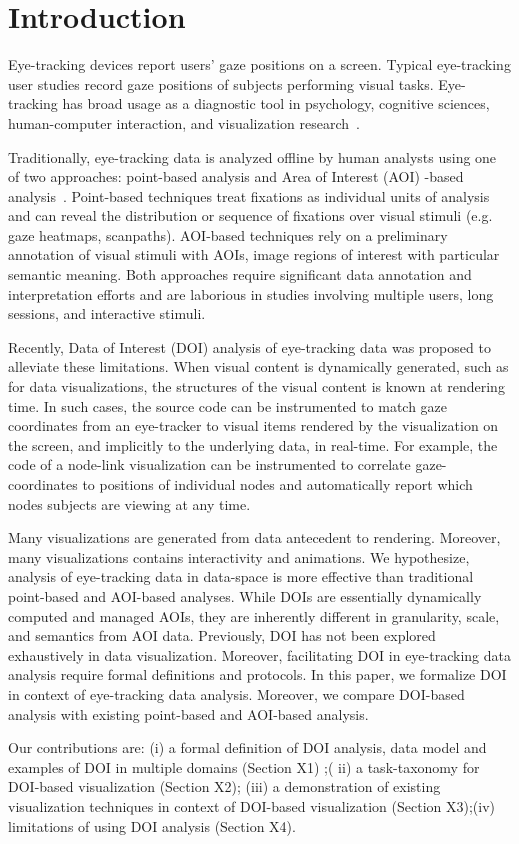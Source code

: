 \section{Introduction}
Eye-tracking devices report users' gaze positions on a screen. Typical eye-tracking user studies record gaze positions of subjects performing visual tasks. Eye-tracking has broad usage as a diagnostic tool in psychology, cognitive sciences, human-computer interaction, and visualization research~\cite{duchowski2002breadth}.

Traditionally, eye-tracking data is analyzed offline by human analysts using one of two approaches: point-based analysis and Area of Interest (AOI) -based analysis~\cite{blascheck2014state}. Point-based techniques treat fixations as individual units of analysis and can reveal the distribution or sequence of fixations over visual stimuli (e.g. gaze heatmaps, scanpaths). AOI-based techniques rely on a preliminary annotation of visual stimuli with AOIs, image regions of interest with particular semantic meaning.  Both approaches require significant data annotation and interpretation efforts and are laborious in studies involving multiple users, long sessions, and interactive stimuli. 

Recently, Data of Interest (DOI) analysis of eye-tracking data was proposed to alleviate these limitations. When visual content is dynamically generated, such as for data visualizations, the structures of the visual content is known at rendering time.  In such cases, the source code can be instrumented to match gaze coordinates from an eye-tracker to visual items rendered by the visualization on the screen, and implicitly to the underlying data, in real-time. For example, the code of a node-link visualization can be instrumented to correlate gaze-coordinates to positions of individual nodes and automatically report which nodes subjects are viewing at any time.  

Many visualizations are generated from data antecedent to rendering. Moreover, many visualizations contains interactivity and animations. We hypothesize, analysis of eye-tracking data in data-space is more effective than traditional point-based and AOI-based analyses. While DOIs are essentially dynamically computed and managed AOIs, they are inherently different in granularity, scale, and semantics from AOI data. Previously, DOI has not been explored exhaustively in data visualization. Moreover, facilitating DOI in eye-tracking data analysis require formal definitions and protocols. In this paper, we formalize DOI in context of eye-tracking data analysis. Moreover, we compare DOI-based analysis with existing point-based and AOI-based analysis.   

Our contributions are: (i) a formal definition of DOI analysis, data model and examples of DOI in multiple domains (Section X1) ;( ii) a task-taxonomy for DOI-based visualization (Section X2); (iii) a demonstration of existing visualization techniques in context of DOI-based visualization (Section X3);(iv) limitations of using DOI analysis (Section X4). 

